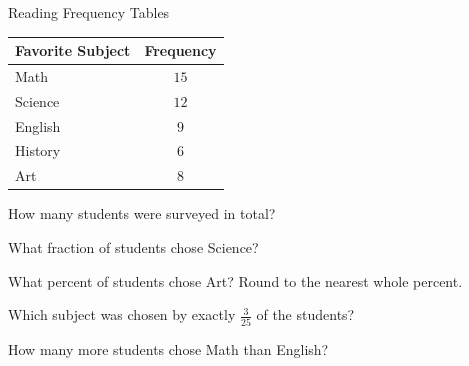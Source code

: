\begin{practiceBox}{Reading Frequency Tables}


\begin{center}
\begin{tabular}{lc}
    \textbf{Favorite Subject} & \textbf{Frequency} \\
    \hline
    Math     & $15$ \\
    Science  & $12$ \\
    English  & $9$ \\
    History  & $6$ \\
    Art      & $8$ \\
\end{tabular}
\end{center}

\prob How many students were surveyed in total? \answerBlank[3cm]

\prob What fraction of students chose Science? \answerBlank[3cm]

\prob What percent of students chose Art? Round to the nearest whole percent. \answerBlank[3cm]

\prob Which subject was chosen by exactly $\frac{3}{25}$ of the students? \answerBlank[3cm]

\prob How many more students chose Math than English? \answerBlank[3cm]

\end{practiceBox}

